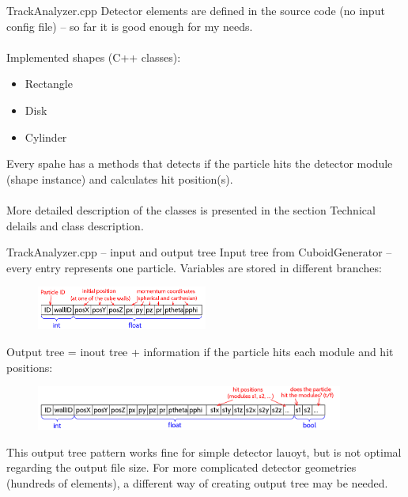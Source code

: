 \documentclass{beamer}
\begin{document}
\begin{frame}{TrackAnalyzer.cpp}
Detector elements are defined in the source code (no input config file) -- so far it is good enough for my needs.\\~\\

Implemented shapes (C++ classes):
	\begin{itemize}
	\item Rectangle
	\item Disk
	\item Cylinder
	\end {itemize}
	
Every spahe has a methods that detects if the particle hits the detector module (shape instance) and calculates hit position(s).\\~\\

More detailed description of the classes is presented in the section Technical delails and class description.
\end{frame}


\begin{frame}{TrackAnalyzer.cpp -- input and output tree}
Input tree  from CuboidGenerator -- every entry represents one particle. Variables are stored in different branches:
\begin{figure}
\includegraphics[width=0.5\textwidth]{images/gentree.png}%
\end{figure}

Output tree = inout tree + information if the particle hits each module and hit positions:
\begin{figure}
\includegraphics[width=0.9\textwidth]{images/outtree.png}%
\end{figure}

This output tree pattern works fine for simple detector lauoyt, but is not optimal regarding the output file size. For more complicated detector geometries (hundreds of elements), a different way of creating output tree may be needed.
\end{frame}
\end{document}
